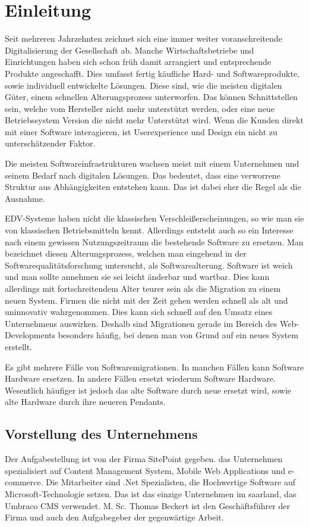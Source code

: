 \chapter{Einleitung}

Seit mehreren Jahrzehnten zeichnet sich eine immer weiter voranschreitende  Digitalisierung der Gesellschaft ab. Manche Wirtschaftsbetriebe und Einrichtungen haben sich schon früh damit arrangiert und entsprechende Produkte angeschafft. Dies umfasst fertig käufliche Hard- und Softwareprodukte, sowie individuell entwickelte Lösungen. Diese sind, wie die meisten digitalen Güter, einem schnellen Alterungsprozess unterworfen. Das können Schnittstellen sein, welche vom Hersteller nicht mehr unterstützt werden, oder eine neue Betriebssystem Version die nicht mehr Unterstützt wird. Wenn die Kunden direkt mit einer Software interagieren, ist Userexperience und Design ein nicht zu unterschätzender Faktor.

Die meisten Softwareinfrastrukturen wachsen meist mit einem Unternehmen und seinem Bedarf nach digitalen Lösungen. Das bedeutet, dass eine verworrene Struktur aus Abhängigkeiten entstehen kann. Das ist dabei eher die Regel als die Ausnahme.

\ac{EDV}-Systeme haben nicht die klassischen Verschleißerscheinungen, so wie man sie von klassischen Betriebsmitteln kennt. Allerdings entsteht auch so ein Interesse nach einem gewissen Nutzungszeitraum die bestehende Software zu ersetzen. Man bezeichnet diesen Alterungsprozess, welchen man eingehend in der Softwarequalitätsforschung untersucht, als Softwarealterung. Software ist \glqq weich\grqq{} und man sollte annehmen sie sei leicht änderbar und wartbar. Dies kann allerdings mit fortschreitendem Alter teurer sein als die Migration zu einem neuen System. Firmen die nicht mit der Zeit gehen werden schnell als alt und uninnovativ wahrgenommen. Dies kann sich schnell auf den Umsatz eines Unternehmens auswirken. Deshalb sind Migrationen gerade im Bereich des Web-Developments besonders häufig, bei denen man von Grund auf ein neues System erstellt.

Es gibt mehrere Fälle von Softwaremigrationen. In manchen Fällen kann Software Hardware ersetzen. In andere Fällen ersetzt wiederum Software Hardware. Wesentlich häufiger ist jedoch das alte Software durch neue ersetzt wird, sowie alte Hardware durch ihre neueren Pendants. 

\section{Vorstellung des Unternehmens}
Der Aufgabestellung ist von der Firma SitePoint gegeben. das Unternehmen spezialisiert auf Content Management System, Mobile Web Applications und e-commerce. Die Mitarbeiter sind .Net Spezialisten, die Hochwertige Software auf Microsoft-Technologie setzen. Das ist das einzige Unternehmen im saarland, das Umbraco CMS verwendet. M. Sc. Thomas Beckert ist den Geschäftsführer der Firma und auch den Aufgabegeber der gegenwärtige Arbeit. \cite{SitePoint2018}  

